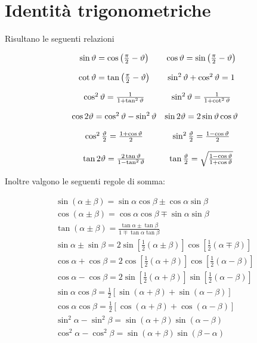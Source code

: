 \section*{Identità trigonometriche}

Risultano le seguenti relazioni

\begin{equation*}
	\begin{array}{ c c }
		\sin \vartheta =\cos\left(\frac{\pi }{2} -\vartheta \right) & \cos \vartheta =\sin\left(\frac{\pi }{2} -\vartheta \right)\\
		[4mm]
		\cot \vartheta =\tan\left(\frac{\pi }{2} -\vartheta \right) & \sin^2 \vartheta +\cos^2 \vartheta =1\\
		[4mm]
		\cos^2 \vartheta =\frac{1}{1+\tan^2 \vartheta } & \sin^2 \vartheta =\frac{1}{1+\cot^2 \vartheta }\\
		[4mm]
		\cos 2\vartheta =\cos^2 \vartheta -\sin^2 \vartheta  & \sin 2\vartheta =2\sin \vartheta \cos \vartheta \\
		[4mm]
		\cos^2\frac{\vartheta }{2} =\frac{1+\cos \vartheta }{2} & \sin^2\frac{\vartheta }{2} =\frac{1-\cos \vartheta }{2}\\
		[4mm]
		\tan 2\vartheta =\frac{2\tan \vartheta }{1-\tan^2 \vartheta } & \tan\frac{\vartheta }{2} =\sqrt{\frac{1-\cos \vartheta }{1+\cos \vartheta }}
	\end{array}
\end{equation*}

Inoltre valgono le seguenti regole di somma:

\begin{equation*}
	\begin{array}{ c }
		\sin( \alpha \pm \beta ) =\sin \alpha \cos \beta \pm \cos \alpha \sin \beta \\
		[4mm]
		\cos( \alpha \pm \beta ) =\cos \alpha \cos \beta \mp \sin \alpha \sin \beta \\
		[4mm]
		\tan( \alpha \pm \beta ) =\frac{\tan \alpha \pm \tan \beta }{1\mp \tan \alpha \tan \beta }\\
		[4mm]
		\sin \alpha \pm \sin \beta =2\sin\left[\frac{1}{2}( \alpha \pm \beta )\right]\cos\left[\frac{1}{2}( \alpha \mp \beta )\right]\\
		[4mm]
		\cos \alpha +\cos \beta =2\cos\left[\frac{1}{2}( \alpha +\beta )\right]\cos\left[\frac{1}{2}( \alpha -\beta )\right]\\
		[4mm]
		\cos \alpha -\cos \beta =2\sin\left[\frac{1}{2}( \alpha +\beta )\right]\sin\left[\frac{1}{2}( \alpha -\beta )\right]\\
		[4mm]
		\sin \alpha \cos \beta =\frac{1}{2}[\sin( \alpha +\beta ) +\sin( \alpha -\beta )]\\
		[4mm]
		\cos \alpha \cos \beta =\frac{1}{2}[\cos( \alpha +\beta ) +\cos( \alpha -\beta )]\\
		[4mm]
		\sin^2 \alpha -\sin^2 \beta =\sin( \alpha +\beta )\sin( \alpha -\beta )\\
		[4mm]
		\cos^2 \alpha -\cos^2 \beta =\sin( \alpha +\beta )\sin( \beta -\alpha )
	\end{array}
\end{equation*}

